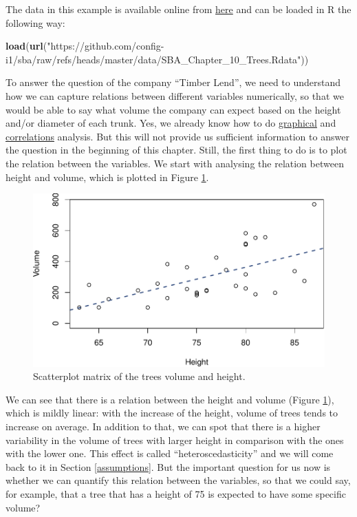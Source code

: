 \documentclass[
]{book}
\newenvironment{Shaded}{\begin{snugshade}}{\end{snugshade}}
\newcommand{\FunctionTok}[1]{\textcolor[rgb]{0.13,0.29,0.53}{\textbf{#1}}}
\newcommand{\NormalTok}[1]{#1}
\newcommand{\StringTok}[1]{\textcolor[rgb]{0.31,0.60,0.02}{#1}}
\theoremstyle{definition}
\theoremstyle{definition}
\theoremstyle{definition}
\theoremstyle{definition}
\theoremstyle{remark}
\begin{document}
The data in this example is available online from \href{https://github.com/config-i1/sba/blob/master/data/SBA_Chapter_10_Trees.Rdata}{here} and can be loaded in R the following way:

\begin{Shaded}
\begin{Highlighting}[]
\FunctionTok{load}\NormalTok{(}\FunctionTok{url}\NormalTok{(}\StringTok{"https://github.com/config{-}i1/sba/raw/refs/heads/master/data/SBA\_Chapter\_10\_Trees.Rdata"}\NormalTok{))}
\end{Highlighting}
\end{Shaded}

To answer the question of the company ``Timber Lend'', we need to understand how we can capture relations between different variables numerically, so that we would be able to say what volume the company can expect based on the height and/or diameter of each trunk. Yes, we already know how to do \hyperref[dataAnalysisGraphical]{graphical} and \hyperref[correlations]{correlations} analysis. But this will not provide us sufficient information to answer the question in the beginning of this chapter. Still, the first thing to do is to plot the relation between the variables. We start with analysing the relation between height and volume, which is plotted in Figure \ref{fig:TreesLine}.

\begin{figure}
\centering
\includegraphics{Svetunkov---Statistics-for-Business-Analytics_files/figure-latex/TreesLine-1.pdf}
\caption{\label{fig:TreesLine}Scatterplot matrix of the trees volume and height.}
\end{figure}

We can see that there is a relation between the height and volume (Figure \ref{fig:TreesLine}), which is mildly linear: with the increase of the height, volume of trees tends to increase on average. In addition to that, we can spot that there is a higher variability in the volume of trees with larger height in comparison with the ones with the lower one. This effect is called ``heteroscedasticity'' and we will come back to it in Section \ref{assumptions}. But the important question for us now is whether we can quantify this relation between the variables, so that we could say, for example, that a tree that has a height of 75 is expected to have some specific volume?
\end{document}
